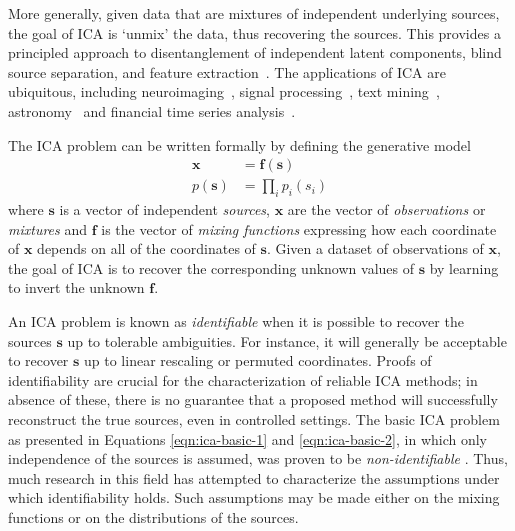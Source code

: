 More generally, given data that are mixtures of independent underlying sources, the goal of ICA is `unmix' the data, thus recovering the sources.
This provides a principled approach to disentanglement of independent latent components, blind source separation, and feature extraction~\citep{hyvarinen2000independent}.
The applications of ICA are ubiquitous, including neuroimaging~\citep{mckeown1998independent}, signal processing~\citep{sawada2003direction}, text mining~\citep{honkela2010wordica}, astronomy~\citep{nuzillard2000blind} and financial time series analysis~\citep{oja2000independent}.

The ICA problem can be written formally by defining the generative model
\begin{align}
\bm{x} &= \bm{f}(\bm{s}) \label{eqn:ica-basic-1}\\
p(\bm{s}) &= \prod_{i} p_i(s_i) \label{eqn:ica-basic-2}
\end{align}
where $\bm{s}$ is a vector of independent \emph{sources}, $\bm{x}$ are the vector of \emph{observations} or \emph{mixtures} and $\bm{f}$ is the vector of \emph{mixing functions} expressing how each coordinate of $\bm{x}$ depends on all of the coordinates of $\bm{s}$. 
Given a dataset of observations of $\bm{x}$, the goal of ICA is to recover the corresponding unknown values of $\bm{s}$ by learning to invert the unknown $\bm{f}$.

An ICA problem is known as \emph{identifiable} when it is possible to recover the sources $\bm{s}$ up to tolerable ambiguities. 
For instance, it will generally be acceptable to recover $\bm{s}$ up to linear rescaling or permuted coordinates.
Proofs of identifiability are crucial for the characterization of reliable ICA methods; in absence of these, there is no guarantee that a proposed method will successfully reconstruct the true sources, even in controlled settings.
The basic ICA problem as presented in Equations \ref{eqn:ica-basic-1} and \ref{eqn:ica-basic-2}, in which only independence of the sources is assumed, was proven to be \emph{non-identifiable} \citep{hyvarinen1999nonlinear}.
Thus, much research in this field has attempted to characterize the assumptions under which identifiability holds.
Such assumptions may be made either on the mixing functions or on the distributions of the sources. 

